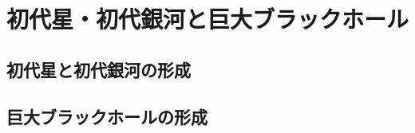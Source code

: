 \documentclass[a4paper,papersize,uplatex,dvipdfmx,10pt]{jsarticle}
\begin{document}
\section{初代星・初代銀河と巨大ブラックホール}
\subsection{初代星と初代銀河の形成}

\subsection{巨大ブラックホールの形成}


%
%
\end{document}
